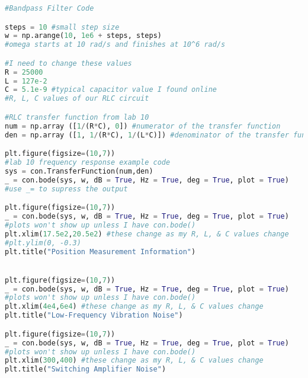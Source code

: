 \documentclass[12pt]{report}
\begin{document}
\begin{lstlisting}[language=Python]
#Bandpass Filter Code

steps = 10 #small step size
w = np.arange(10, 1e6 + steps, steps) 
#omega starts at 10 rad/s and finishes at 10^6 rad/s

#I need to change these values
R = 25000
L = 127e-2
C = 5.1e-9 #typical capacitor value I found online
#R, L, C values of our RLC circuit

#RLC transfer function from lab 10
num = np.array ([1/(R*C), 0]) #numerator of the transfer function
den = np.array ([1, 1/(R*C), 1/(L*C)]) #denominator of the transfer function

plt.figure(figsize=(10,7))
#lab 10 frequency response example code
sys = con.TransferFunction(num,den)
_ = con.bode(sys, w, dB = True, Hz = True, deg = True, plot = True)
#use _= to supress the output

plt.figure(figsize=(10,7))
_ = con.bode(sys, w, dB = True, Hz = True, deg = True, plot = True)
#plots won't show up unless I have con.bode()
plt.xlim(17.5e2,20.5e2) #these change as my R, L, & C values change
#plt.ylim(0, -0.3)
plt.title("Position Measurement Information")


plt.figure(figsize=(10,7))
_ = con.bode(sys, w, dB = True, Hz = True, deg = True, plot = True)
#plots won't show up unless I have con.bode()
plt.xlim(4e4,6e4) #these change as my R, L, & C values change
plt.title("Low-Frequency Vibration Noise")

plt.figure(figsize=(10,7))
_ = con.bode(sys, w, dB = True, Hz = True, deg = True, plot = True)
#plots won't show up unless I have con.bode()
plt.xlim(300,400) #these change as my R, L, & C values change
plt.title("Switching Amplifier Noise")
\end{lstlisting}
\end{document}
